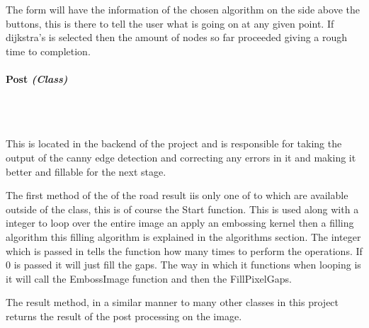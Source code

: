 \begin{FlushLeft}
    The form will have the information of the chosen algorithm on the side above the buttons, this is there to tell the user what is going on at any given point. If dijkstra's is selected then the amount of nodes so far proceeded giving a rough time to completion. \\ 


    \bk

    \pagebreak
\paragraph{Post \textit{(Class)}} \mbox{} \\

    \begin{figure}[H]
        \centering
    \end{figure}\\

    This is located in the backend of the project and is responsible for taking the output of the canny edge detection and correcting any errors in it and making it better and fillable for the next stage.
    
    The first method of the of the road result iis only one of to which are available outside of the class, this is of course the Start function. This is used along with a integer to loop over the entire image an apply an embossing kernel then a filling algorithm this filling algorithm is explained in the algorithms section. The integer which is passed in tells the function how many times to perform the operations. If 0 is passed it will just fill the gaps. The way in which it functions when looping is it will call the EmbossImage function and then the FillPixelGaps.\\ \bk

    The result method, in a similar manner to many other classes in this project returns the result of the post processing on the image.\\
    \bk


\end{FlushLeft}
